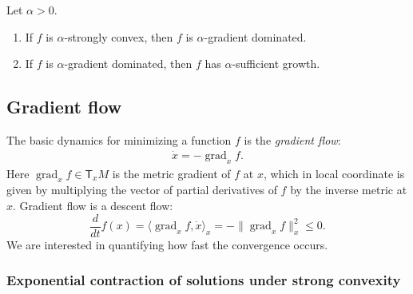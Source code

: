 \documentclass[final,12pt]{colt2018}
\DeclareMathOperator{\grad}{grad}
\newcommand{\T}{\mathsf{T}}
\newcommand{\M}{{M}}
\begin{document}
\begin{lemma}\label{Lem:SC}
Let $\alpha > 0$.
\begin{enumerate}
  \item If $f$ is $\alpha$-strongly convex, then $f$ is $\alpha$-gradient dominated.
  \item If $f$ is $\alpha$-gradient dominated, then $f$ has $\alpha$-sufficient growth.
\end{enumerate}
\end{lemma}


\subsection{Gradient flow}

The basic dynamics for minimizing a function $f$ is the {\em gradient flow}:
\begin{align}\label{Eq:GFGen}
\dot x = -\grad_x f.
\end{align}
Here $\grad_x f \in \T_x\M$ is the metric gradient of $f$ at $x$, which in local coordinate is given by multiplying the vector of partial derivatives of $f$ by the inverse metric at $x$.
Gradient flow is a descent flow:
$$\frac{d}{dt} f(x) = \langle \grad_x f, \dot x \rangle_x = -\|\grad_x f\|^2_x \le 0.$$
We are interested in quantifying how fast the convergence occurs.


\subsubsection{Exponential contraction of solutions under strong convexity}
\end{document}
